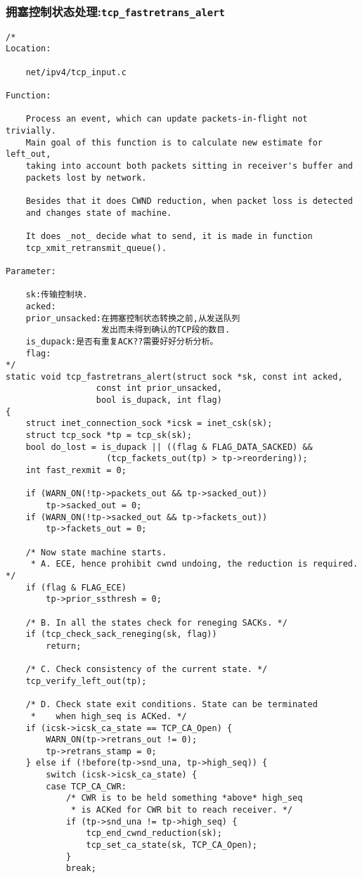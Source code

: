 		\subsubsection{拥塞控制状态处理:\texttt{tcp_fastretrans_alert}}
\begin{verbatim}
/* 
Location:

	net/ipv4/tcp_input.c

Function:

	Process an event, which can update packets-in-flight not trivially.
	Main goal of this function is to calculate new estimate for left_out,
	taking into account both packets sitting in receiver's buffer and
	packets lost by network.
	
	Besides that it does CWND reduction, when packet loss is detected
	and changes state of machine.
	
	It does _not_ decide what to send, it is made in function
	tcp_xmit_retransmit_queue().

Parameter:

	sk:传输控制块.
	acked:
	prior_unsacked:在拥塞控制状态转换之前,从发送队列
				   发出而未得到确认的TCP段的数目.
	is_dupack:是否有重复ACK??需要好好分析分析。
	flag:
*/
static void tcp_fastretrans_alert(struct sock *sk, const int acked,
				  const int prior_unsacked,
				  bool is_dupack, int flag)
{
	struct inet_connection_sock *icsk = inet_csk(sk);
	struct tcp_sock *tp = tcp_sk(sk);
	bool do_lost = is_dupack || ((flag & FLAG_DATA_SACKED) &&
				    (tcp_fackets_out(tp) > tp->reordering));
	int fast_rexmit = 0;

	if (WARN_ON(!tp->packets_out && tp->sacked_out))
		tp->sacked_out = 0;
	if (WARN_ON(!tp->sacked_out && tp->fackets_out))
		tp->fackets_out = 0;

	/* Now state machine starts.
	 * A. ECE, hence prohibit cwnd undoing, the reduction is required. */
	if (flag & FLAG_ECE)
		tp->prior_ssthresh = 0;

	/* B. In all the states check for reneging SACKs. */
	if (tcp_check_sack_reneging(sk, flag))
		return;

	/* C. Check consistency of the current state. */
	tcp_verify_left_out(tp);

	/* D. Check state exit conditions. State can be terminated
	 *    when high_seq is ACKed. */
	if (icsk->icsk_ca_state == TCP_CA_Open) {
		WARN_ON(tp->retrans_out != 0);
		tp->retrans_stamp = 0;
	} else if (!before(tp->snd_una, tp->high_seq)) {
		switch (icsk->icsk_ca_state) {
		case TCP_CA_CWR:
			/* CWR is to be held something *above* high_seq
			 * is ACKed for CWR bit to reach receiver. */
			if (tp->snd_una != tp->high_seq) {
				tcp_end_cwnd_reduction(sk);
				tcp_set_ca_state(sk, TCP_CA_Open);
			}
			break;


\end{verbatim}
